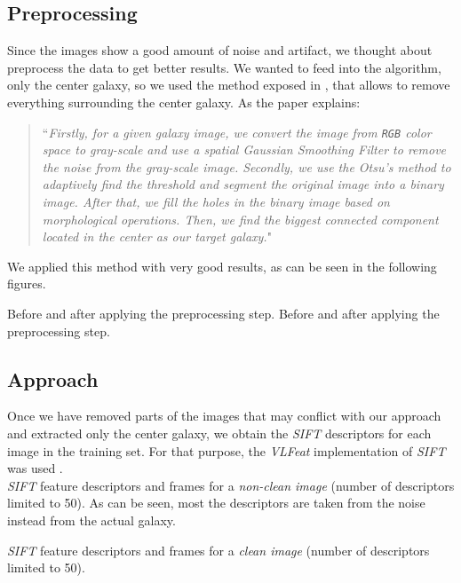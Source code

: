 \documentclass{vldb}
\begin{document}
\subsection{Preprocessing}
Since the images show a good amount of noise and artifact, we thought about preprocess the data to get better results. We wanted to feed into the algorithm, only the center galaxy, so we used the method exposed in \cite{cui14}, that allows to remove everything surrounding the center galaxy. As the paper explains:

\begin{quotation}
``\emph{Firstly, for a given galaxy image, we convert the image from \texttt{RGB} color space to gray-scale and use a spatial \emph{Gaussian Smoothing Filter} to remove the noise from the gray-scale image. Secondly, we use \emph{the Otsu’s method} to adaptively find the threshold and segment the original image into a binary image. After that, we fill the holes in the binary image based on morphological operations. Then, we find the biggest connected component located in the center as our target galaxy.}"
\end{quotation}

We applied this method with very good results, as can be seen in the following figures.

{Before and after applying the preprocessing step.}
{Before and after applying the preprocessing step.}


\subsection{Approach}
Once we have removed parts of the images that may conflict with our approach and extracted only the center galaxy, we obtain the \emph{SIFT} descriptors for each image in the training set. For that purpose, the \emph{VLFeat} implementation of \emph{SIFT} was used \cite{vlfeat}. \\

{\emph{SIFT} feature descriptors and frames for a \emph{non-clean image} (number of descriptors limited to 50). As can be seen, most the descriptors are taken from the noise instead from the actual galaxy.}

{\emph{SIFT} feature descriptors and frames for a \emph{clean image} (number of descriptors limited to 50).}
\end{document}
